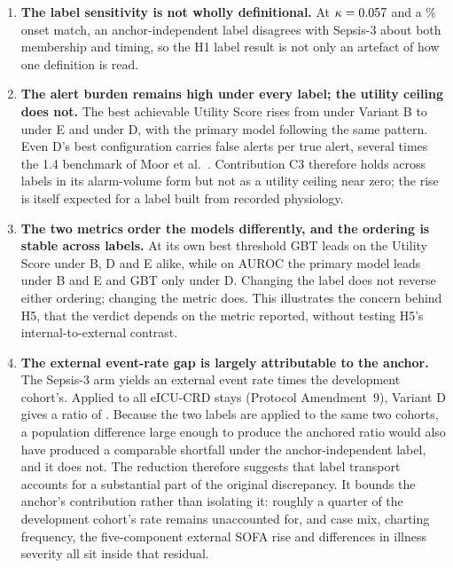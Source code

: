 \begin{enumerate}
    \item \textbf{The label sensitivity is not wholly definitional.} At
    $\kappa = 0.057$ and a \pcPctExactMatchD\% onset match, an
    anchor-independent label disagrees with Sepsis-3 about both membership and
    timing, so the H1 label result is not only an artefact of how one
    definition is read.

    \item \textbf{The alert burden remains high under every label; the
    utility ceiling does not.} The best achievable Utility Score rises from
    \pcUtilityMaxGbtB{} under Variant B to \pcUtilityMaxGbtE{} under E and
    \pcUtilityMaxGbtD{} under D, with the primary model following the same
    pattern. Even D's best configuration carries \pcUtilityOptBurdenGbtD{}
    false alerts per true alert, several times the 1.4 benchmark of Moor et
    al.\ \cite{moor2023review}. Contribution C3 therefore holds across labels
    in its alarm-volume form but not as a utility ceiling near zero; the rise
    is itself expected for a label built from recorded physiology.

    \item \textbf{The two metrics order the models differently, and the
    ordering is stable across labels.} At its own best threshold GBT leads on
    the Utility Score under B, D and E alike, while on AUROC the primary model
    leads under B and E and GBT only under D. Changing the label does not
    reverse either ordering; changing the metric does. This illustrates the
    concern behind H5, that the verdict depends on the metric reported, without
    testing H5's internal-to-external contrast.

    \item \textbf{The external event-rate gap is largely attributable to the
    anchor.} The Sepsis-3 arm yields an external event rate
    \pcExtRateRatioB{} times the development cohort's. Applied to all
    \pcExtAltNStays{} eICU-CRD stays (Protocol Amendment~9), Variant D gives a
    ratio of \pcExtAltRateRatio. Because the two labels are applied to the
    same two cohorts, a population difference large enough to produce the
    anchored ratio would also have produced a comparable shortfall under the
    anchor-independent label, and it does not. The reduction therefore
    suggests that label transport accounts for a substantial part of the
    original discrepancy. It bounds the anchor's contribution rather than
    isolating it: roughly a quarter of the development cohort's rate remains
    unaccounted for, and case mix, charting frequency, the five-component
    external SOFA rise and differences in illness severity all sit inside that
    residual.
\end{enumerate}

